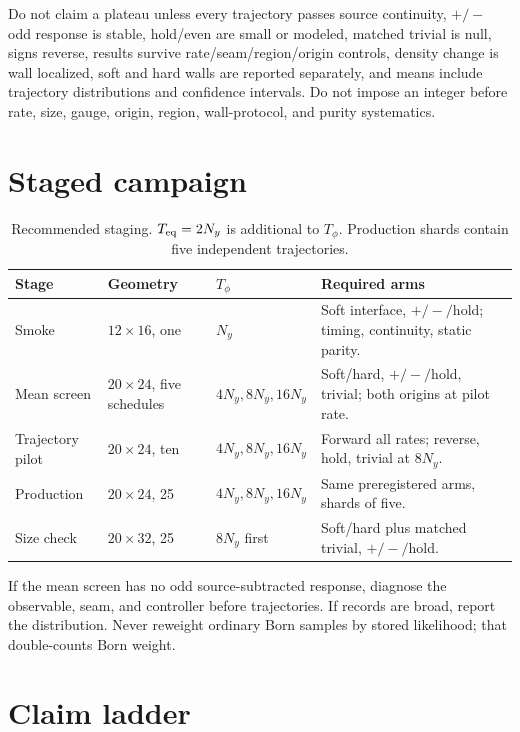 \documentclass[aps,prb,onecolumn,nofootinbib,superscriptaddress]{revtex4-2}
\begin{document}
Do not claim a plateau unless every trajectory passes source continuity,
$+/-$ odd response is stable, hold/even are small or modeled, matched trivial
is null, signs reverse, results survive rate/seam/region/origin controls,
density change is wall localized, soft and hard walls are reported separately,
and means include trajectory distributions and confidence intervals.  Do not
impose an integer before rate, size, gauge, origin, region, wall-protocol, and
purity systematics.

\section{Staged campaign}
\label{sec:campaign}

\begin{table}[b]
\caption{Recommended staging.  $T_{\rm eq}=2N_y$ is additional to $T_\phi$.
Production shards contain five independent trajectories.}
\begin{tabularx}{\textwidth}{@{}L{0.14\textwidth}L{0.15\textwidth}L{0.13\textwidth}Y@{}}
\toprule
Stage & Geometry & $T_\phi$ & Required arms \\
\midrule
Smoke & $12\times16$, one & $N_y$
& Soft interface, $+/-/$hold; timing, continuity, static parity. \\
Mean screen & $20\times24$, five schedules & $4N_y,8N_y,16N_y$
& Soft/hard, $+/-/$hold, trivial; both origins at pilot rate. \\
Trajectory pilot & $20\times24$, ten & $4N_y,8N_y,16N_y$
& Forward all rates; reverse, hold, trivial at $8N_y$. \\
Production & $20\times24$, 25 & $4N_y,8N_y,16N_y$
& Same preregistered arms, shards of five. \\
Size check & $20\times32$, 25 & $8N_y$ first
& Soft/hard plus matched trivial, $+/-/$hold. \\
\bottomrule
\end{tabularx}
\end{table}

If the mean screen has no odd source-subtracted response, diagnose the
observable, seam, and controller before trajectories.  If records are broad,
report the distribution.  Never reweight ordinary Born samples by stored
likelihood; that double-counts Born weight.

\section{Claim ladder}
\end{document}
